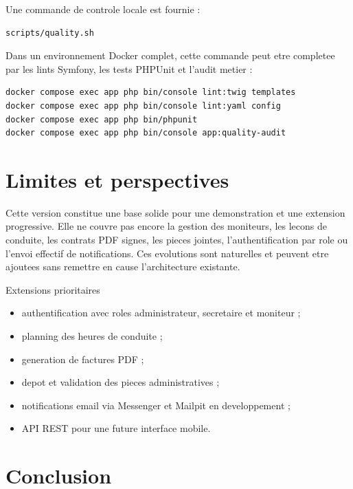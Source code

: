 \documentclass[11pt,a4paper]{article}
\newenvironment{compactitem}{\begin{itemize}[leftmargin=1.2em,itemsep=3pt,topsep=2pt]}{\end{itemize}}
\begin{document}
Une commande de controle locale est fournie :

\begin{lstlisting}[language=bash]
scripts/quality.sh
\end{lstlisting}

Dans un environnement Docker complet, cette commande peut etre completee par les lints Symfony, les tests PHPUnit et l'audit metier :

\begin{lstlisting}[language=bash]
docker compose exec app php bin/console lint:twig templates
docker compose exec app php bin/console lint:yaml config
docker compose exec app php bin/phpunit
docker compose exec app php bin/console app:quality-audit
\end{lstlisting}

\section{Limites et perspectives}

Cette version constitue une base solide pour une demonstration et une extension progressive. Elle ne couvre pas encore la gestion des moniteurs, les lecons de conduite, les contrats PDF signes, les pieces jointes, l'authentification par role ou l'envoi effectif de notifications. Ces evolutions sont naturelles et peuvent etre ajoutees sans remettre en cause l'architecture existante.

\begin{decisionbox}{Extensions prioritaires}
\begin{compactitem}
  \item authentification avec roles administrateur, secretaire et moniteur ;
  \item planning des heures de conduite ;
  \item generation de factures PDF ;
  \item depot et validation des pieces administratives ;
  \item notifications email via Messenger et Mailpit en developpement ;
  \item API REST pour une future interface mobile.
\end{compactitem}
\end{decisionbox}

\section{Conclusion}
\end{document}
